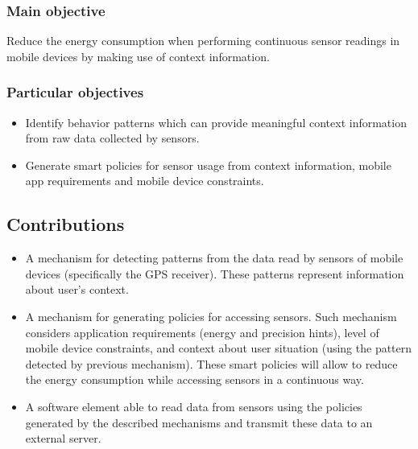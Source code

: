 \subsubsection{Main objective}
\label{ssub:main_objective}
Reduce the energy consumption when performing continuous sensor readings in mobile devices by making use of context information. 

\subsubsection{Particular objectives} 
\label{ssub:particular_objectives}
\begin{itemize}
  \item {Identify behavior patterns which can provide meaningful context information from raw data collected by sensors}.
  \item {Generate smart policies for sensor usage from context information, mobile app requirements and mobile device constraints}.
\end{itemize}


\subsection{Contributions} 
\label{sub:contributions}

\begin{itemize}
  \item A mechanism for detecting patterns from the data read by sensors of mobile devices (specifically the GPS receiver).
  These patterns represent information about user's context.
  \item A mechanism for generating policies for accessing sensors.
        Such mechanism considers application requirements (energy and precision hints), level of mobile device constraints, and context about user situation (using the pattern detected by previous mechanism).
        These smart policies will allow to reduce the energy consumption while accessing sensors in a continuous way.
  \item A software element able to read data from sensors using the policies generated by the described mechanisms and transmit these data to an external server.
\end{itemize}